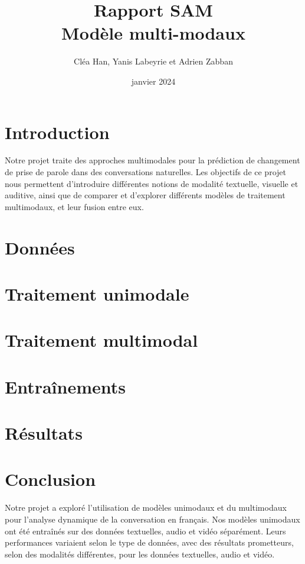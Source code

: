 \documentclass[a4paper]{article}
\title{Rapport SAM \\ Modèle multi-modaux}
\author{Cléa Han, Yanis Labeyrie et Adrien Zabban}
\date{janvier 2024}
\begin{document}
\maketitle
\bigskip
\tableofcontents
\newpage

\section{Introduction}

Notre projet traite des approches multimodales pour la prédiction de changement de prise de parole dans des conversations naturelles. 
Les objectifs de ce projet nous permettent d'introduire différentes notions de modalité textuelle, visuelle et auditive, ainsi que de
comparer et d'explorer différents modèles de traitement multimodaux, et leur fusion entre eux.

\section{Données}


\section{Traitement unimodale}


\section{Traitement multimodal}


\section{Entraînements}


\section{Résultats}



\section{Conclusion}

Notre projet a exploré l'utilisation de modèles unimodaux et du multimodaux pour l'analyse dynamique de la conversation en français.
Nos modèles unimodaux ont été entraînés sur des données textuelles, audio et vidéo séparément. 
Leurs performances variaient selon le type de données, avec des résultats prometteurs, selon des modalités différentes, pour les données textuelles, audio et vidéo.
\end{document}
